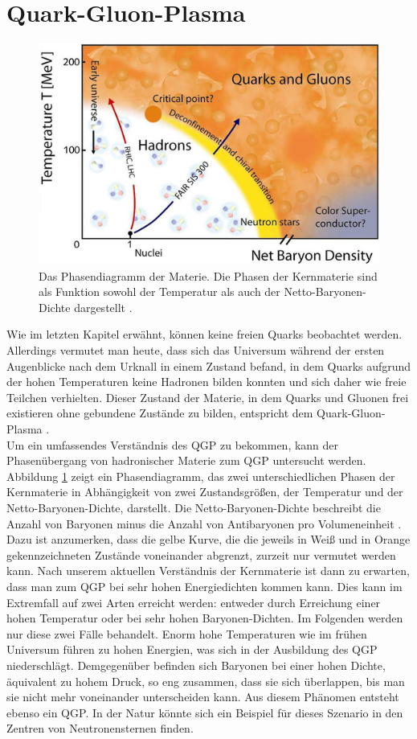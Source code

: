 \documentclass[12pt,a4paper]{report}
\begin{document}
\section{Quark-Gluon-Plasma}
\label{sec:QGP}
\begin{figure}
\centering
\includegraphics[width=13cm]{Phasenuebergang.png} 
\caption{Das Phasendiagramm der Materie. Die Phasen der Kernmaterie sind als Funktion sowohl der Temperatur als auch der Netto-Baryonen-Dichte dargestellt \cite{GSS}.}
\label{Phasenuebergang}
\end{figure}
Wie im letzten Kapitel erwähnt, können keine freien Quarks beobachtet werden. Allerdings vermutet man heute, dass sich das Universum während der ersten Augenblicke nach dem Urknall in einem Zustand befand, in dem Quarks aufgrund der hohen Temperaturen keine Hadronen bilden konnten und sich daher wie freie Teilchen verhielten. Dieser Zustand der Materie, in dem Quarks und Gluonen frei existieren ohne gebundene Zustände zu bilden, entspricht dem Quark-Gluon-Plasma \cite{sarkar2009physics}. \\
Um ein umfassendes Verständnis des QGP zu bekommen, kann der Phasenübergang von hadronischer Materie zum QGP untersucht werden. Abbildung \ref{Phasenuebergang} zeigt ein Phasendiagramm, das zwei unterschiedlichen Phasen der Kernmaterie in Abhängigkeit von zwei Zustandsgrößen, der Temperatur und der Netto-Baryonen-Dichte, darstellt. Die Netto-Baryonen-Dichte beschreibt die Anzahl von Baryonen minus die Anzahl von Antibaryonen pro Volumeneinheit \cite{buhrke2013geheimnisvoller}. Dazu ist anzumerken, dass die gelbe Kurve, die die jeweils in Weiß und in Orange gekennzeichneten Zustände voneinander abgrenzt, zurzeit nur vermutet werden kann. Nach unserem aktuellen Verständnis der Kernmaterie ist dann zu erwarten, dass man zum QGP bei sehr hohen Energiedichten kommen kann. Dies kann im Extremfall auf zwei Arten erreicht werden: entweder durch Erreichung einer hohen Temperatur oder bei sehr hohen Baryonen-Dichten. Im Folgenden werden nur diese zwei Fälle behandelt. Enorm hohe Temperaturen wie im frühen Universum führen zu hohen Energien, was sich in der Ausbildung des QGP niederschlägt. Demgegenüber befinden sich Baryonen bei einer hohen Dichte, äquivalent zu hohem Druck, so eng zusammen, dass sie sich überlappen, bis man sie nicht mehr voneinander unterscheiden kann. Aus diesem Phänomen entsteht ebenso ein QGP. In der Natur könnte sich ein Beispiel für dieses Szenario in den Zentren von Neutronensternen finden.\\
\end{document}
